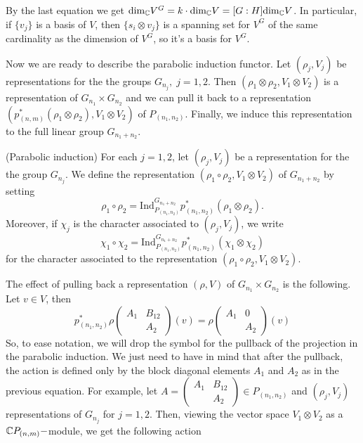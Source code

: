 By the last equation we get $\text{dim}_{\mathbb{C}}V^G=k\cdot\text{dim}_{\mathbb{C}}V=[G:H]\text{dim}_{\mathbb{C}}V$. In particular, if $\{v_j\}$ is a basis of $V$, then $\{s_i\otimes v_j\}$ is a spanning set for $V^G$ of the same cardinality as the dimension of $V^G$, so it's a basis for $V^G$.\par
Now we are ready to describe the parabolic induction functor. Let $(\rho_j,V_j)$ be representations for the the groups $G_{n_j},\;j=1,2$. Then $(\rho_1\otimes\rho_2, V_{1}\otimes V_{2})$ is a representation of $G_{n_1}\times G_{n_2}$ and we can pull it back to a representation $(p_{(n,m)}^*(\rho_1\otimes\rho_2),  V_{1}\otimes V_{2})$ of $P_{(n_1,n_2)}$. Finally, we induce this representation to the full linear group $G_{n_1+n_2}$.
\begin{dang}
    \begin{definition}(Parabolic induction)
         For each $j=1,2$, let $(\rho_j,V_j)$ be a representation for the the group $G_{n_j}$. We define the representation $(\rho_1\circ\rho_2, V_1\otimes V_2)$ of $G_{n_1+n_2}$ by setting
        \begin{equation}
            \rho_1\circ\rho_2=\text{Ind}_{P_{(n_1,n_2)}}^{G_{n_1+n_2}}p_{(n_1,n_2)}^*(\rho_1\otimes\rho_2).
        \end{equation}
        Moreover, if $\chi_j$ is the character associated to $(\rho_j,V_j)$, we write 
        \begin{equation}
            \chi_1\circ\chi_2=\text{Ind}_{P_{(n_1,n_2)}}^{G_{n_1+n_2}}p_{(n_1,n_2)}^*(\chi_1\otimes\chi_2)
        \end{equation}
        for the character associated to the representation $(\rho_1\circ\rho_2, V_1\otimes V_2)$.
    \end{definition}
\end{dang}
The effect of pulling back a representation $(\rho,V)$ of $G_{n_1}\times G_{n_2}$ is the following. Let $v\in V$, then 
\begin{equation}
    p_{(n_1,n_2)}^*\rho\left(\begin{smallmatrix}
        A_1 & B_{12}\\
            & A_2
    \end{smallmatrix}\right)(v) = \rho\left(\begin{smallmatrix}
        A_1 & 0\\
            & A_2
    \end{smallmatrix}\right)(v)
\end{equation}
So, to ease notation, we will drop the symbol for the pullback of the projection in the parabolic induction. We just need to have in mind that after the pullback, the action is defined only by the block diagonal elements $A_1$ and $A_2$ as in the previous equation. For example, let $A=\left(\begin{smallmatrix}
A_1&B_{12}\\
   & A_2
\end{smallmatrix}\right)\in P_{(n_1,n_2)}$ and $(\rho_j,V_j)$ representations of $G_{n_j}$ for $j=1,2$. Then, viewing the vector space $V_1\otimes V_2$ as a $\mathbb{C}P_{(n,m)}-$module, we get the following action
